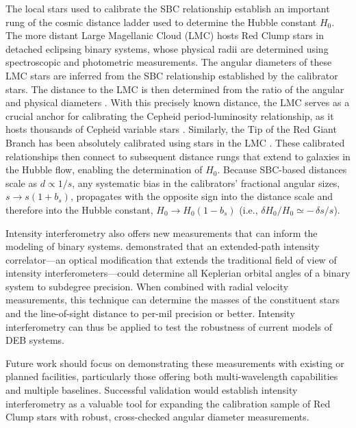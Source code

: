 \documentclass[linenumbers,trackchanges,margins]{aastex701}
\begin{document}
The local stars used to calibrate the SBC relationship establish an important rung of the cosmic distance ladder used to determine the Hubble constant $H_0$.
The more distant Large Magellanic Cloud (LMC) hosts Red Clump stars in detached eclipsing binary systems, whose physical radii are determined using spectroscopic and photometric measurements. The angular diameters of these LMC stars are inferred from the SBC relationship established by the calibrator stars. The distance to the LMC is then determined from the ratio of the angular and physical diameters \citep{2019Natur.567..200P}.
With this precisely known distance, the LMC serves as a crucial anchor for calibrating the Cepheid period-luminosity relationship, as it hosts thousands of Cepheid variable stars
\citep{Riess_2019}.  Similarly, the Tip of the Red Giant Branch has been absolutely calibrated
using stars in the LMC \citep{2018ApJ...858...12H}. These calibrated relationships then connect to subsequent distance rungs that extend to galaxies in the Hubble flow, enabling the determination of $H_0$.
Because SBC-based distances scale as $d \propto 1/s$, any systematic bias in the calibrators' fractional angular sizes, $s \rightarrow s(1+b_s)$, propagates with the opposite sign into the distance scale and therefore into the Hubble constant, $H_0 \rightarrow H_0(1-b_s)$ (i.e., $\delta H_0/H_0 \simeq -\,\delta s/s$).

Intensity interferometry also offers new measurements that can inform the modeling of binary systems. \citet{wqz5-2jjs} demonstrated that an extended-path intensity correlator—an optical modification that extends the traditional field of view of intensity interferometers—could determine all Keplerian orbital angles of a binary system to subdegree precision. When combined with radial velocity measurements, this technique can determine the masses of the constituent stars and the line-of-sight distance to per-mil precision or better. Intensity interferometry can thus be applied to test the robustness of current models of DEB systems.

Future work should focus on demonstrating these measurements with existing or planned facilities, particularly those offering both multi-wavelength capabilities and multiple baselines. Successful validation would establish intensity interferometry as a valuable tool for expanding the calibration sample of Red Clump stars with robust, cross-checked angular diameter measurements.



\end{document}
